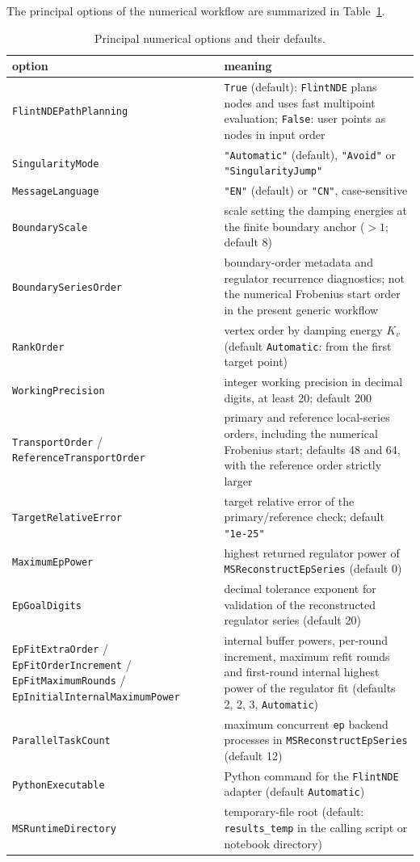 \documentclass[11pt,a4paper]{article}
\numberwithin{table}{section}
\begin{document}
The principal options of the numerical workflow are summarized in Table~\ref{tab:numerical-options}.
\begin{table}[!htbp]
\centering
\begin{tabular}{@{}p{6.2cm}p{8.1cm}@{}}
\toprule
option & meaning\\
\midrule
\texttt{FlintNDEPathPlanning} & \texttt{True} (default): \texttt{FlintNDE} plans nodes and uses fast
multipoint evaluation; \texttt{False}: user points as nodes in input order\\
\texttt{SingularityMode} & \texttt{"Automatic"} (default), \texttt{"Avoid"} or \texttt{"SingularityJump"}\\
\texttt{MessageLanguage} & \texttt{"EN"} (default) or \texttt{"CN"}, case-sensitive\\
\texttt{BoundaryScale} & scale setting the damping energies at the finite boundary anchor ($>1$; default 8)\\
\texttt{BoundarySeriesOrder} & boundary-order metadata and regulator recurrence diagnostics; not the numerical Frobenius start order in the present generic workflow\\
\texttt{RankOrder} & vertex order by damping energy $K_v$ (default \texttt{Automatic}: from the first target point)\\
\texttt{WorkingPrecision} & integer working precision in decimal digits, at least 20; default 200\\
\texttt{TransportOrder} / \texttt{ReferenceTransportOrder} & primary and reference local-series orders, including the numerical Frobenius start; defaults 48 and 64, with the reference order strictly larger\\
\texttt{TargetRelativeError} & target relative error of the primary/reference check; default \texttt{"1e-25"}\\
\texttt{MaximumEpPower} & highest returned regulator power of \texttt{MSReconstructEpSeries}
(default 0)\\
\texttt{EpGoalDigits} & decimal tolerance exponent for validation of the reconstructed regulator series
(default 20)\\
\texttt{EpFitExtraOrder} / \texttt{EpFitOrderIncrement} / \texttt{EpFitMaximumRounds} / \texttt{EpInitialInternalMaximumPower} & internal
buffer powers, per-round increment, maximum refit rounds and first-round internal highest power of
the regulator fit (defaults 2, 2, 3, \texttt{Automatic})\\
\texttt{ParallelTaskCount} & maximum concurrent \texttt{ep} backend processes in \texttt{MSReconstructEpSeries} (default 12)\\
\texttt{PythonExecutable} & Python command for the \texttt{FlintNDE} adapter (default \texttt{Automatic})\\
\texttt{MSRuntimeDirectory} & temporary-file root (default: \texttt{results\_temp} in the calling script or notebook directory)\\
\bottomrule
\end{tabular}
\caption{Principal numerical options and their defaults.}
\label{tab:numerical-options}
\end{table}
\FloatBarrier
\end{document}
